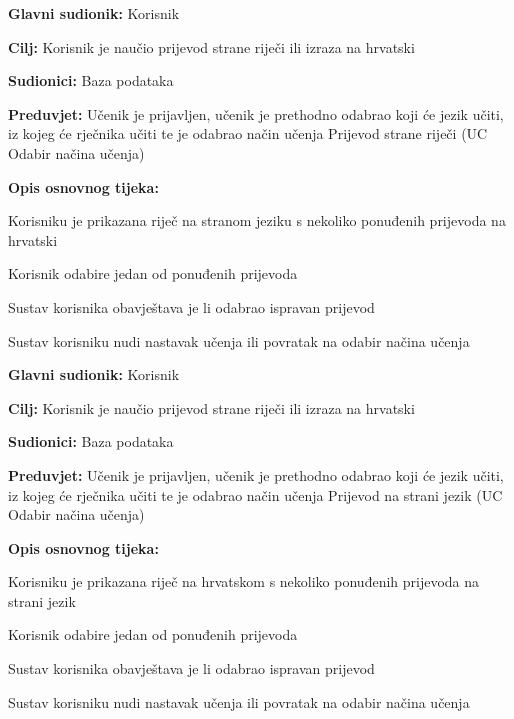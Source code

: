 \noindent {}
\begin{packed_item}

	\item \textbf{Glavni sudionik: } Korisnik
	\item \textbf{Cilj: } Korisnik je naučio prijevod strane riječi ili izraza na hrvatski
	\item \textbf{Sudionici: } Baza podataka
	\item \textbf{Preduvjet: } Učenik je prijavljen, učenik je prethodno odabrao koji će jezik učiti, iz kojeg će rječnika učiti te je odabrao način učenja Prijevod strane riječi (UC Odabir načina učenja)
	\item  \textbf{Opis osnovnog tijeka:}
	
	\item[] \begin{packed_enum}
		
		\item Korisniku je prikazana riječ na stranom jeziku s nekoliko ponuđenih prijevoda na hrvatski
		\item Korisnik odabire jedan od ponuđenih prijevoda
		\item Sustav korisnika obavještava je li odabrao ispravan prijevod
		\item Sustav korisniku nudi nastavak učenja ili povratak na odabir načina učenja

	\end{packed_enum}

\end{packed_item}


\noindent {}
\begin{packed_item}

	\item \textbf{Glavni sudionik: } Korisnik
	\item \textbf{Cilj: } Korisnik je naučio prijevod strane riječi ili izraza na hrvatski
	\item \textbf{Sudionici: } Baza podataka
	\item \textbf{Preduvjet: } Učenik je prijavljen, učenik je prethodno odabrao koji će jezik učiti, iz kojeg će rječnika učiti te je odabrao način učenja Prijevod na strani jezik (UC Odabir načina učenja)
	\item  \textbf{Opis osnovnog tijeka:} 
	
	\item[] \begin{packed_enum}
		
		\item Korisniku je prikazana riječ na hrvatskom s nekoliko ponuđenih prijevoda na strani jezik
		\item Korisnik odabire jedan od ponuđenih prijevoda
		\item Sustav korisnika obavještava je li odabrao ispravan prijevod
		\item Sustav korisniku nudi nastavak učenja ili povratak na odabir načina učenja

	\end{packed_enum}

\end{packed_item}



